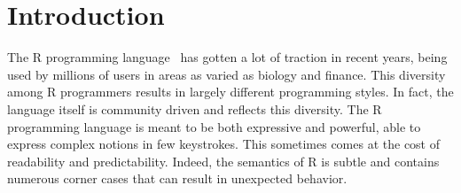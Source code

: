 \documentclass[
    sigplan,
    10pt,
    review, %
    natbib=false %
 ]{acmart}
\begin{document}



\maketitle

\section{Introduction}
\label{sec:intro}

The R programming language~\parencite{R, ihaka1996r, Rwebsite}
has gotten a lot of traction in recent years, being used by millions of users in areas as varied as biology and finance. This diversity among R programmers results in largely different programming styles. In fact, the language itself is community driven and reflects this diversity.
The R programming language is meant to be both expressive and powerful,
able to express complex notions in few keystrokes.
This sometimes comes at the cost of readability and predictability. Indeed,
the semantics of R is subtle and contains numerous corner cases that can result in unexpected behavior.
\end{document}
